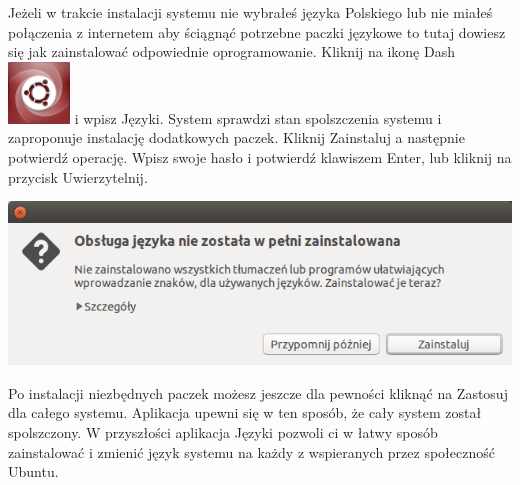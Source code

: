 Jeżeli w trakcie instalacji systemu nie wybrałeś języka Polskiego lub nie miałeś połączenia z internetem aby ściągnąć potrzebne paczki językowe to tutaj dowiesz się jak zainstalować odpowiednie oprogramowanie.
Kliknij na ikonę Dash \includegraphics[scale=0.35]{images/ikony_dash.png} i wpisz \textcolor{ubuntu_orange}{Języki}. System sprawdzi stan spolszczenia systemu i zaproponuje instalację dodatkowych paczek. Kliknij \textcolor{ubuntu_orange}{Zainstaluj} a następnie potwierdź operację. Wpisz swoje hasło i potwierdź klawiszem Enter, lub kliknij na przycisk \textcolor{ubuntu_orange}{Uwierzytelnij}.
\begin{center}
        \includegraphics{images/pierwsze_uruchomienie_lang2.png}
\end{center}

Po instalacji niezbędnych paczek możesz jeszcze dla pewności kliknąć na \textcolor{ubuntu_orange}{Zastosuj dla całego systemu}. Aplikacja upewni się w ten sposób, że cały system został spolszczony.
W przyszłości aplikacja \textcolor{ubuntu_orange}{Języki} pozwoli ci w łatwy sposób zainstalować i zmienić język systemu na każdy z wspieranych przez społeczność Ubuntu.

